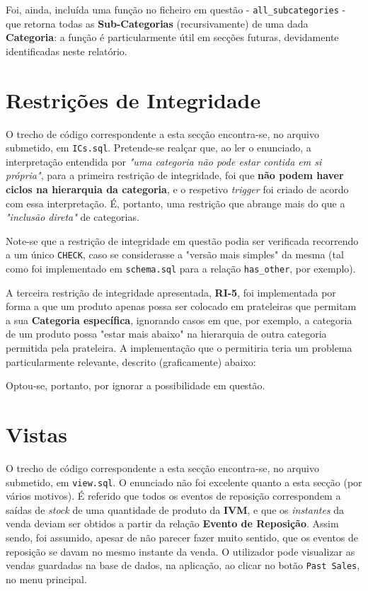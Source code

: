 \documentclass[12pt,a4paper]{article}
\begin{document}
Foi, ainda, incluída uma função no ficheiro em questão - \texttt{all\_subcategories} -
que retorna todas as \textbf{Sub-Categorias} (recursivamente) de uma dada \textbf{Categoria}:
a função é particularmente útil em secções futuras, devidamente identificadas
neste relatório.

\section*{Restrições de Integridade}

O trecho de código correspondente a esta secção encontra-se, no arquivo submetido,
em \texttt{ICs.sql}. Pretende-se realçar que, ao ler o enunciado, a interpretação
entendida por \textit{"uma categoria não pode estar contida em si própria"}, para
a primeira restrição de integridade, foi que \textbf{não podem haver ciclos na
  hierarquia da categoria}, e o respetivo \textit{trigger} foi criado de acordo
com essa interpretação. É, portanto, uma restrição que abrange mais do que
a \textit{"inclusão direta"} de categorias.

Note-se que a restrição de integridade em questão podia ser verificada recorrendo
a um único \texttt{CHECK}, caso se considerasse a "versão mais simples" da mesma (tal
como foi implementado em \texttt{schema.sql} para a relação \texttt{has\_other},
por exemplo).

A terceira restrição de integridade apresentada, \textbf{RI-5}, foi implementada
por forma a que um produto apenas possa ser colocado em prateleiras que permitam
a sua \textbf{Categoria específica}, ignorando casos em que, por exemplo, a categoria
de um produto possa "estar mais abaixo" na hierarquia de outra categoria permitida
pela prateleira. A implementação que o permitiria teria um problema particularmente
relevante, descrito (graficamente) abaixo:

\begin{figure}
  \centering
  
\end{figure}

Optou-se, portanto, por ignorar a possibilidade em questão.

\section*{Vistas}

O trecho de código correspondente a esta secção encontra-se, no arquivo submetido,
em \texttt{view.sql}. O enunciado não foi excelente quanto a esta secção (por vários motivos).
É referido que todos os eventos de reposição correspondem a saídas de \textit{stock} de uma
quantidade de produto da \textbf{IVM}, e que os \textit{instantes} da venda
deviam ser obtidos a partir da relação \textbf{Evento de Reposição}. Assim sendo,
foi assumido, apesar de não parecer fazer muito sentido, que os eventos de reposição
se davam no mesmo instante da venda. O utilizador pode visualizar as vendas guardadas
na base de dados, na aplicação, ao clicar no botão \texttt{Past Sales}, no menu principal.
\end{document}

